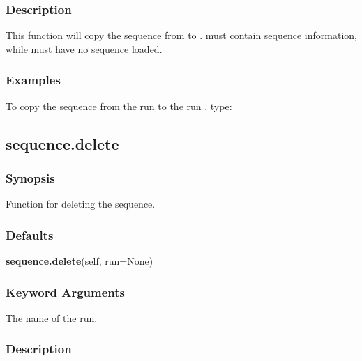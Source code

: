   

  
 \subsubsection{Description} 

 This function will copy the sequence from  to .   must contain sequence information, while  must have no sequence loaded. 
  

  
 \subsubsection{Examples} 

 To copy the sequence from the run  to the run , type: 
  



  

 \newpage 

 \subsection{sequence.delete} 

  
 \subsubsection{Synopsis} 

 Function for deleting the sequence. 
  

  
 \subsubsection{Defaults} 

 \textsf{\textbf{sequence.delete}(self, run=None)} 

  
 \subsubsection{Keyword Arguments} 

   The name of the run.  

  

  
 \subsubsection{Description} 

